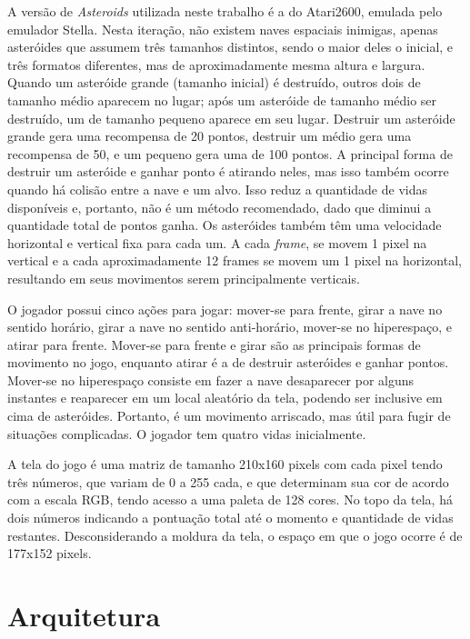 A versão de \textit{Asteroids} utilizada neste trabalho é a do Atari2600, emulada pelo emulador Stella. Nesta iteração, não existem naves espaciais inimigas, apenas asteróides que assumem três tamanhos distintos, sendo o maior deles o inicial, e três formatos diferentes, mas de aproximadamente mesma altura e largura.
Quando um asteróide grande (tamanho inicial) é destruído, outros dois de tamanho médio aparecem no lugar; após um asteróide de tamanho médio ser destruído, um de tamanho pequeno aparece em seu lugar.
Destruir um asteróide grande gera uma recompensa de 20 pontos, destruir um médio gera uma recompensa de 50, e um pequeno gera uma de 100 pontos.
A principal forma de destruir um asteróide e ganhar ponto é atirando neles, mas isso também ocorre quando há colisão entre a nave e um alvo. Isso reduz a quantidade de vidas disponíveis e, portanto, não é um método recomendado, dado que diminui a quantidade total de pontos ganha.
Os asteróides também têm uma velocidade horizontal e vertical fixa para cada um. A cada \textit{frame}, se movem 1 pixel na vertical e a cada aproximadamente 12 frames se movem um 1 pixel na horizontal, resultando em seus movimentos serem principalmente verticais.

O jogador possui cinco ações para jogar: mover-se para frente, girar a nave no sentido horário, girar a nave no sentido anti-horário, mover-se no hiperespaço, e atirar para frente.
Mover-se para frente e girar são as principais formas de movimento no jogo, enquanto atirar é a de destruir asteróides e ganhar pontos.
Mover-se no hiperespaço consiste em fazer a nave desaparecer por alguns instantes e reaparecer em um local aleatório da tela, podendo ser inclusive em cima de asteróides. Portanto, é um movimento arriscado, mas útil para fugir de situações complicadas.
O jogador tem quatro vidas inicialmente.

A tela do jogo é uma matriz de tamanho 210x160 pixels com cada pixel tendo três números, que variam de 0 a 255 cada, e que determinam sua cor de acordo com a escala RGB, tendo acesso a uma paleta de 128 cores. No topo da tela, há dois números indicando a pontuação total até o momento e quantidade de vidas restantes. Desconsiderando a moldura da tela, o espaço em que o jogo ocorre é de 177x152 pixels.

\section{Arquitetura}
\label{sec:arq}


